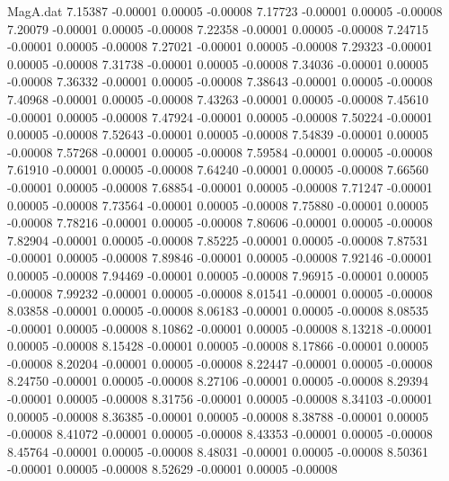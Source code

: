 \begin{filecontents}{MagA.dat}
   7.15387   -0.00001    0.00005   -0.00008
   7.17723   -0.00001    0.00005   -0.00008
   7.20079   -0.00001    0.00005   -0.00008
   7.22358   -0.00001    0.00005   -0.00008
   7.24715   -0.00001    0.00005   -0.00008
   7.27021   -0.00001    0.00005   -0.00008
   7.29323   -0.00001    0.00005   -0.00008
   7.31738   -0.00001    0.00005   -0.00008
   7.34036   -0.00001    0.00005   -0.00008
   7.36332   -0.00001    0.00005   -0.00008
   7.38643   -0.00001    0.00005   -0.00008
   7.40968   -0.00001    0.00005   -0.00008
   7.43263   -0.00001    0.00005   -0.00008
   7.45610   -0.00001    0.00005   -0.00008
   7.47924   -0.00001    0.00005   -0.00008
   7.50224   -0.00001    0.00005   -0.00008
   7.52643   -0.00001    0.00005   -0.00008
   7.54839   -0.00001    0.00005   -0.00008
   7.57268   -0.00001    0.00005   -0.00008
   7.59584   -0.00001    0.00005   -0.00008
   7.61910   -0.00001    0.00005   -0.00008
   7.64240   -0.00001    0.00005   -0.00008
   7.66560   -0.00001    0.00005   -0.00008
   7.68854   -0.00001    0.00005   -0.00008
   7.71247   -0.00001    0.00005   -0.00008
   7.73564   -0.00001    0.00005   -0.00008
   7.75880   -0.00001    0.00005   -0.00008
   7.78216   -0.00001    0.00005   -0.00008
   7.80606   -0.00001    0.00005   -0.00008
   7.82904   -0.00001    0.00005   -0.00008
   7.85225   -0.00001    0.00005   -0.00008
   7.87531   -0.00001    0.00005   -0.00008
   7.89846   -0.00001    0.00005   -0.00008
   7.92146   -0.00001    0.00005   -0.00008
   7.94469   -0.00001    0.00005   -0.00008
   7.96915   -0.00001    0.00005   -0.00008
   7.99232   -0.00001    0.00005   -0.00008
   8.01541   -0.00001    0.00005   -0.00008
   8.03858   -0.00001    0.00005   -0.00008
   8.06183   -0.00001    0.00005   -0.00008
   8.08535   -0.00001    0.00005   -0.00008
   8.10862   -0.00001    0.00005   -0.00008
   8.13218   -0.00001    0.00005   -0.00008
   8.15428   -0.00001    0.00005   -0.00008
   8.17866   -0.00001    0.00005   -0.00008
   8.20204   -0.00001    0.00005   -0.00008
   8.22447   -0.00001    0.00005   -0.00008
   8.24750   -0.00001    0.00005   -0.00008
   8.27106   -0.00001    0.00005   -0.00008
   8.29394   -0.00001    0.00005   -0.00008
   8.31756   -0.00001    0.00005   -0.00008
   8.34103   -0.00001    0.00005   -0.00008
   8.36385   -0.00001    0.00005   -0.00008
   8.38788   -0.00001    0.00005   -0.00008
   8.41072   -0.00001    0.00005   -0.00008
   8.43353   -0.00001    0.00005   -0.00008
   8.45764   -0.00001    0.00005   -0.00008
   8.48031   -0.00001    0.00005   -0.00008
   8.50361   -0.00001    0.00005   -0.00008
   8.52629   -0.00001    0.00005   -0.00008

\end{filecontents}
